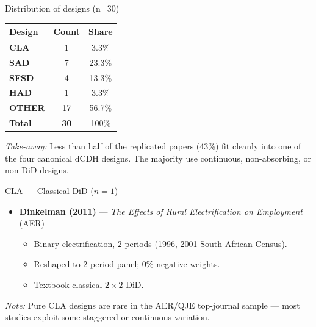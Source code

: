 \documentclass[10pt,aspectratio=169]{beamer}
\begin{document}
\begin{frame}{Distribution of designs (n=30)}
\centering
\begin{tabular}{lcc}
\toprule
\textbf{Design} & \textbf{Count} & \textbf{Share} \\
\midrule
\textcolor{claColor}{\textbf{CLA}}   & 1  & 3.3\% \\
\textcolor{sadColor}{\textbf{SAD}}   & 7  & 23.3\% \\
\textcolor{sfsdColor}{\textbf{SFSD}} & 4  & 13.3\% \\
\textcolor{hadColor}{\textbf{HAD}}   & 1  & 3.3\% \\
\textcolor{otherColor}{\textbf{OTHER}} & 17 & 56.7\% \\
\midrule
\textbf{Total} & \textbf{30} & 100\% \\
\bottomrule
\end{tabular}

\vspace{1em}
\footnotesize
\textit{Take-away:} Less than half of the replicated papers (43\%) fit cleanly into one of the four canonical dCDH designs. The majority use continuous, non-absorbing, or non-DiD designs.
\end{frame}

\begin{frame}{\textcolor{claColor}{CLA} --- Classical DiD ($n=1$)}
\begin{itemize}
  \item \textbf{Dinkelman (2011)} --- \emph{The Effects of Rural Electrification on Employment} (AER)
  \begin{itemize}
    \item Binary electrification, 2 periods (1996, 2001 South African Census).
    \item Reshaped to 2-period panel; 0\% negative weights.
    \item Textbook classical $2\times 2$ DiD.
  \end{itemize}
\end{itemize}
\vfill
\footnotesize\textit{Note:} Pure CLA designs are rare in the AER/QJE top-journal sample --- most studies exploit some staggered or continuous variation.
\end{frame}
\end{document}

